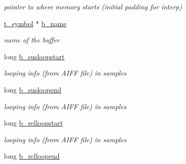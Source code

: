 \begin{DoxyCompactItemize}
\begin{DoxyCompactList}\small\item\em pointer to where memory starts (initial padding for interp) \item\end{DoxyCompactList}\item 
\hypertarget{structt__buffer_a0c5c9c5f21573db201bdb2502439cf72}{
\hyperlink{structt__symbol}{t\_\-symbol} $\ast$ \hyperlink{structt__buffer_a0c5c9c5f21573db201bdb2502439cf72}{b\_\-name}}
\label{structt__buffer_a0c5c9c5f21573db201bdb2502439cf72}

\begin{DoxyCompactList}\small\item\em name of the buffer \item\end{DoxyCompactList}\item 
\hypertarget{structt__buffer_a328838c04c62453255265176b8cb0947}{
long \hyperlink{structt__buffer_a328838c04c62453255265176b8cb0947}{b\_\-susloopstart}}
\label{structt__buffer_a328838c04c62453255265176b8cb0947}

\begin{DoxyCompactList}\small\item\em looping info (from AIFF file) in samples \item\end{DoxyCompactList}\item 
\hypertarget{structt__buffer_a09ac5cec8c1b28ca5824e28deb8cbcc1}{
long \hyperlink{structt__buffer_a09ac5cec8c1b28ca5824e28deb8cbcc1}{b\_\-susloopend}}
\label{structt__buffer_a09ac5cec8c1b28ca5824e28deb8cbcc1}

\begin{DoxyCompactList}\small\item\em looping info (from AIFF file) in samples \item\end{DoxyCompactList}\item 
\hypertarget{structt__buffer_a622f16db4d88d0afa5ebc31d713ab962}{
long \hyperlink{structt__buffer_a622f16db4d88d0afa5ebc31d713ab962}{b\_\-relloopstart}}
\label{structt__buffer_a622f16db4d88d0afa5ebc31d713ab962}

\begin{DoxyCompactList}\small\item\em looping info (from AIFF file) in samples \item\end{DoxyCompactList}\item 
\hypertarget{structt__buffer_a3b42440e19f989c3d7832fdc346bbb88}{
long \hyperlink{structt__buffer_a3b42440e19f989c3d7832fdc346bbb88}{b\_\-relloopend}}
\label{structt__buffer_a3b42440e19f989c3d7832fdc346bbb88}


\end{DoxyCompactItemize}

